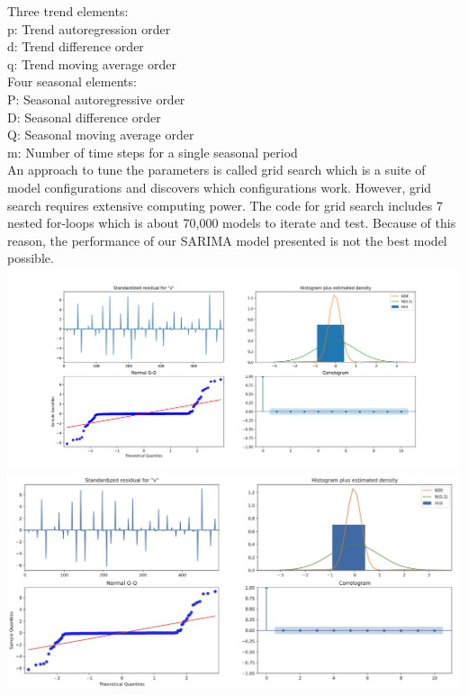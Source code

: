 \documentclass{article}
\begin{document}
	Three trend elements:\\
    p: Trend autoregression order\\
    d: Trend difference order\\
    q: Trend moving average order\\

    Four seasonal elements:\\
    P: Seasonal autoregressive order\\
    D: Seasonal difference order\\
    Q: Seasonal moving average order\\
    m: Number of time steps for a single seasonal period\\

	An approach to tune the parameters is called grid search which is a suite of model configurations and discovers which configurations work. However, grid search requires extensive computing power. The code for grid search includes 7 nested for-loops which is about 70,000 models to iterate and test. Because of this reason, the performance of our SARIMA model presented is not the best model possible.\\
	
	\includegraphics[scale = 0.2]{../plots/2018/zillow2018_SARIMA-model.png} \\
	
	\includegraphics[scale = 0.2]{../plots/2018/zillow2018_SARIMA_stats1.png} \\
	
\end{document}
